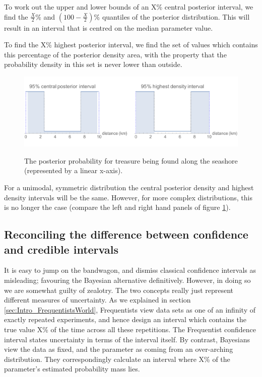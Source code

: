 \documentclass[11pt,fullpage]{book}
\begin{document}
To work out the upper and lower bounds of an X\% central posterior interval, we find the $\frac{X}{2}\%$ and $(100-\frac{X}{2})\%$ quantiles of the posterior distribution. This will result in an interval that is centred on the median parameter value.

To find the X\% highest posterior interval, we find the set of values which contains this percentage of the posterior density area, with the property that the probability density in this set is never lower than outside.

\begin{figure}
\centering
\scalebox{0.35} 
{\includegraphics{Posterior_CPIvsHDI.pdf}}
\caption{The posterior probability for treasure being found along the seashore (represented by a linear x-axis).}\label{fig:Posterior_CPIvsHDI}
\end{figure}

For a unimodal, symmetric distribution the central posterior density and highest density intervals will be the same. However, for more complex distributions, this is no longer the case (compare the left and right hand panels of figure \ref{fig:Posterior_CPIvsHDI}).


\subsection{Reconciling the difference between confidence and credible intervals}
It is easy to jump on the bandwagon, and dismiss classical confidence intervals as misleading; favouring the Bayesian alternative definitively. However, in doing so we are somewhat guilty of zealotry. The two concepts really just represent different measures of uncertainty. As we explained in section \ref{sec:Intro_FrequentistsWorld}, Frequentists view data sets as one of an infinity of exactly repeated experiments, and hence design an interval which contains the true value X\% of the time across all these repetitions. The Frequentist confidence interval states uncertainty in terms of the interval itself. By contrast, Bayesians view the data as fixed, and the parameter as coming from an over-arching distribution. They correspondingly calculate an interval where X\% of the parameter's estimated probability mass lies.
\end{document}
